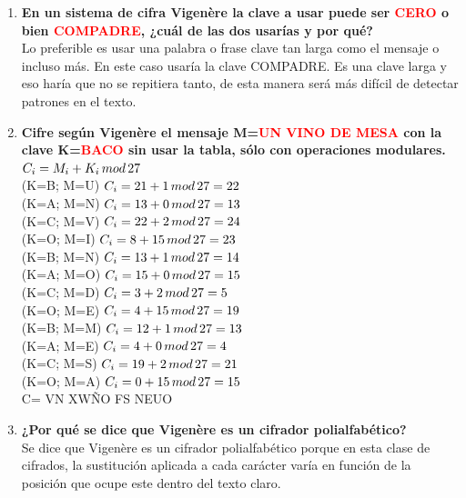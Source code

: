\documentclass{article}
\begin{document}
\begin{enumerate}
 
    \item \textbf{En un sistema de cifra Vigenère la clave a usar puede ser \textcolor{red}{CERO} o bien \textcolor{red}{COMPADRE}, ¿cuál de las dos usarías y por qué?}\\
    Lo preferible es usar una palabra o frase clave tan larga como el mensaje o incluso más. En este caso usaría la clave COMPADRE. Es una clave larga y eso haría que no se repitiera tanto, de esta manera será más difícil de detectar patrones en el texto.   
    
    \item \textbf{Cifre según Vigenère el mensaje M=\textcolor{red}{UN VINO DE MESA} con la clave K=\textcolor{red}{BACO} sin usar la tabla, sólo con operaciones modulares.}\\
     $C_{i}= M_{i} + K_{i} \thinspace  mod \thinspace 27$\\
    (K=B; M=U)
     $C_{i}= 21+ 1 \thinspace mod \thinspace 27 = 22$\\
    (K=A; M=N)
     $C_{i}= 13 + 0 \thinspace mod \thinspace 27 = 13$\\
    (K=C; M=V)
     $C_{i}= 22 + 2 \thinspace mod \thinspace 27 = 24$\\
    (K=O; M=I)
    $C_{i}= 8 + 15 \thinspace mod \thinspace 27 = 23$\\
    (K=B; M=N)
    $C_{i}= 13 + 1 \thinspace mod \thinspace 27 = 14$\\
    (K=A; M=O)
    $C_{i}= 15 + 0 \thinspace mod \thinspace 27 = 15$\\
    (K=C; M=D)
    $C_{i}= 3 + 2 \thinspace mod \thinspace 27 = 5$\\
    (K=O; M=E)
    $C_{i}= 4 + 15 \thinspace mod \thinspace 27 = 19$\\
    (K=B; M=M)
    $C_{i}= 12 + 1 \thinspace mod \thinspace 27 = 13$\\
    (K=A; M=E)
    $C_{i}= 4 + 0 \thinspace mod \thinspace 27 = 4$\\
    (K=C; M=S)
    $C_{i}= 19 + 2 \thinspace mod \thinspace 27 = 21$\\
    (K=O; M=A)
    $C_{i}= 0 + 15 \thinspace mod \thinspace 27 = 15$\\ 
    C= VN XWÑO FS NEUO



    \item \textbf{¿Por qué se dice que Vigenère es un cifrador polialfabético?}\\
    Se dice que Vigenère es un cifrador polialfabético porque en esta clase de cifrados, la sustitución aplicada a cada carácter varía en función de la posición que ocupe este dentro del texto claro. 
    

\end{enumerate}
\end{document}
